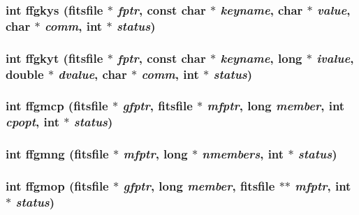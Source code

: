 \subsubsection{\setlength{\rightskip}{0pt plus 5cm}int ffgkys (\bf{fitsfile} $\ast$ {\em fptr}, const char $\ast$ {\em keyname}, char $\ast$ {\em value}, char $\ast$ {\em comm}, int $\ast$ {\em status})}\label{test_2roimasker_2fitsio_8h_556303d192d9b46c3fa0950d058f6245}


\subsubsection{\setlength{\rightskip}{0pt plus 5cm}int ffgkyt (\bf{fitsfile} $\ast$ {\em fptr}, const char $\ast$ {\em keyname}, long $\ast$ {\em ivalue}, double $\ast$ {\em dvalue}, char $\ast$ {\em comm}, int $\ast$ {\em status})}\label{test_2roimasker_2fitsio_8h_dd68662c84062c1a1c4433358adb0e3f}


\subsubsection{\setlength{\rightskip}{0pt plus 5cm}int ffgmcp (\bf{fitsfile} $\ast$ {\em gfptr}, \bf{fitsfile} $\ast$ {\em mfptr}, long {\em member}, int {\em cpopt}, int $\ast$ {\em status})}\label{test_2roimasker_2fitsio_8h_d83bfc8f05c1ecdb704484508df35e48}


\subsubsection{\setlength{\rightskip}{0pt plus 5cm}int ffgmng (\bf{fitsfile} $\ast$ {\em mfptr}, long $\ast$ {\em nmembers}, int $\ast$ {\em status})}\label{test_2roimasker_2fitsio_8h_4ce8704aab9e63b3a93ccbf135f20eab}


\subsubsection{\setlength{\rightskip}{0pt plus 5cm}int ffgmop (\bf{fitsfile} $\ast$ {\em gfptr}, long {\em member}, \bf{fitsfile} $\ast$$\ast$ {\em mfptr}, int $\ast$ {\em status})}\label{test_2roimasker_2fitsio_8h_eb970a59dfa22c61d5df8bc212391228}


